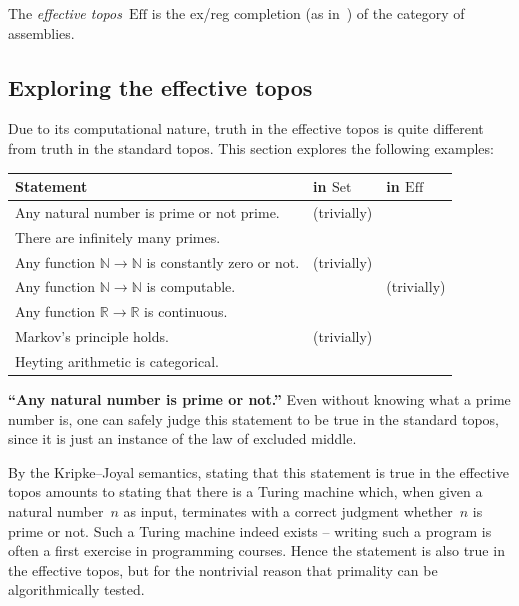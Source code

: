 \documentclass[graybox]{svmult}
\newcommand{\cmark}{\ding{51}}
\newcommand{\xmark}{\ding{55}}
\newcommand{\NN}{\mathbb{N}}
\newcommand{\RR}{\mathbb{R}}
\newcommand{\Set}{\mathrm{Set}}
\newcommand{\Eff}{\mathrm{Ef{}f}}
\renewcommand{\_}{\mathpunct{.}\,}
\newcommand{\effective}{ef{}fective\xspace}
\newcommand{\?}{\,{:}\,}
\begin{document}
\begin{definition}The \emph{\effective topos}~$\Eff$ is the ex/reg completion (as
in~\cite[Section~3.4]{menni:exact}) of the category of assemblies.\end{definition}



\subsection{Exploring the \effective topos}
\label{sect:eff-examples}
Due to its computational nature, truth in the \effective topos is quite
different from truth in the standard topos. This section explores the following
examples:

\bigskip
\begin{center}
\begin{tabular}{ll@{\qquad}l}
  \toprule
  Statement & in $\Set$ & in $\Eff$ \\
  \midrule
  Any natural number is prime or not prime. & \cmark{} (trivially) & \cmark \\
  There are infinitely many primes. & \cmark & \cmark \\
  Any function $\NN \to \NN$ is constantly zero or not. & \cmark{} (trivially) & \xmark \\
  Any function $\NN \to \NN$ is computable. & \xmark & \cmark{} (trivially) \\
  Any function $\RR \to \RR$ is continuous. & \xmark & \cmark \\
  Markov's principle holds. & \cmark{} (trivially) & \cmark \\
  Heyting arithmetic is categorical. & \xmark & \cmark \\
  \bottomrule
\end{tabular}
\end{center}
\bigskip

\newcommand{\dotparagraph}[1]{\noindent\textbf{#1}}

\begin{example}\textbf{``Any natural number is prime or not.''} Even without knowing what
a prime number is, one can safely judge this statement to be true in
the standard topos, since it is just an instance of the law of excluded middle.

By the Kripke--Joyal semantics, stating that this statement is true in the \effective topos
amounts to stating that there is a Turing machine which, when given a natural
number~$n$ as input, terminates with a correct judgment whether~$n$ is prime or
not. Such a Turing machine indeed exists -- writing such a program is often a
first exercise in programming courses. Hence the statement is also true in the
\effective topos, but for the nontrivial reason that primality can be
algorithmically tested.
\end{example}
\end{document}

